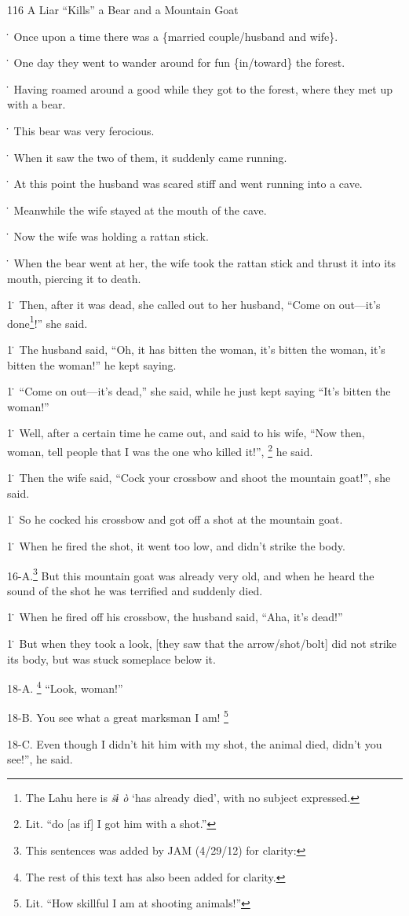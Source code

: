 
116 A Liar ``Kills'' a Bear and a Mountain Goat

\. Once upon a time there was a \{married couple/husband and wife\}.

\. One day they went to wander around for fun \{in/toward\} the forest.

\. Having roamed around a good while they got to the forest, where they met up
with a bear.

\. This bear was very ferocious.

\. When it saw the two of them, it suddenly came running.

\. At this point the husband was scared stiff and went running into a cave.

\. Meanwhile the wife stayed at the mouth of the cave.

\. Now the wife was holding a rattan stick.

\. When the bear went at her, the wife took the rattan stick and thrust it into
its mouth, piercing it to death.

1\. Then, after it was dead, she called out to her husband, ``Come on out---it's
done\footnote{The Lahu here is \textit{šɨ ò} `has already died', with no subject expressed.}!'' she said.

1\. The husband said, ``Oh, it has bitten the woman, it's bitten the woman, it's
bitten the woman!'' he kept saying.

1\. ``Come on out---it's dead,'' she said, while he just kept saying ``It's bitten
the woman!''

1\. Well, after a certain time he came out, and said to his wife, ``Now then, woman,
tell people that I was the one who killed it!'', \footnote{Lit. ``do [as if] I got him with a shot.''} he said.

1\. Then the wife said, ``Cock your crossbow and shoot the mountain goat!'', she
said.

1\. So he cocked his crossbow and got off a shot at the mountain goat.

1\. When he fired the shot, it went too low, and didn't strike the body.

16-A.\footnote{This sentences was added by JAM (4/29/12) for clarity:} But this mountain goat was already very old, and when he heard the sound
of the shot he was terrified and suddenly died.

1\. When he fired off his crossbow, the husband said, ``Aha, it's dead!''

1\. But when they took a look, [they saw that the arrow/shot/bolt] did not strike
its body, but was stuck someplace below it.

18-A. \footnote{The rest of this text has also been added for clarity.} ``Look, woman!''

18-B. You see what a great marksman I am! \footnote{Lit. ``How skillful I am at shooting animals!''}

18-C. Even though I didn't hit him with my shot, the animal died, didn't you see!'',
he said.

